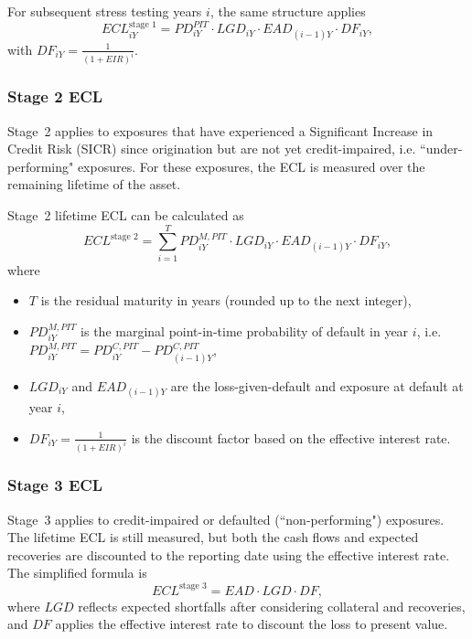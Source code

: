 \documentclass[11pt,a4paper]{article}
\begin{document}
For subsequent stress testing years $i$, the same structure applies
\begin{equation}
ECL_{iY}^{\text{stage 1}} = PD_{iY}^{PIT} \cdot LGD_{iY} \cdot EAD_{(i - 1)Y} \cdot DF_{iY},
\end{equation}
with $DF_{iY} = \frac{1}{(1 + EIR)^{i}}$.

\subsubsection{Stage 2 ECL}

Stage~2 applies to exposures that have experienced a Significant Increase in Credit Risk (SICR) since origination but are not yet credit-impaired, i.e. ``under-performing" exposures. For these exposures, the ECL is measured over the remaining lifetime of the asset.

Stage~2 lifetime ECL can be calculated as
\begin{equation}
ECL^{\text{stage 2}} = \sum_{i = 1}^{T} PD_{iY}^{M, PIT} \cdot LGD_{iY} \cdot EAD_{(i - 1)Y} \cdot DF_{iY},
\end{equation}
where
\begin{itemize}
\item $T$ is the residual maturity in years (rounded up to the next integer),
\item $PD_{iY}^{M, PIT}$ is the marginal point-in-time probability of default in year $i$, i.e.
      $PD_{iY}^{M, PIT} = PD_{iY}^{C, PIT} - PD_{(i - 1)Y}^{C, PIT}$,
\item $LGD_{iY}$ and $EAD_{(i - 1)Y}$ are the loss-given-default and exposure at default at year $i$,
\item $DF_{iY} = \frac{1}{(1 + EIR)^{i}}$ is the discount factor based on the effective interest rate.
\end{itemize}

\subsubsection{Stage 3 ECL}

Stage~3 applies to credit-impaired or defaulted (``non-performing") exposures. The lifetime ECL is still measured, but both the cash flows and expected recoveries are discounted to the reporting date using the effective interest rate. The simplified formula is
\begin{equation}
ECL^{\text{stage 3}} = EAD \cdot LGD \cdot DF,
\end{equation}
where $LGD$ reflects expected shortfalls after considering collateral and recoveries, and $DF$ applies the effective interest rate to discount the loss to present value.
\end{document}
